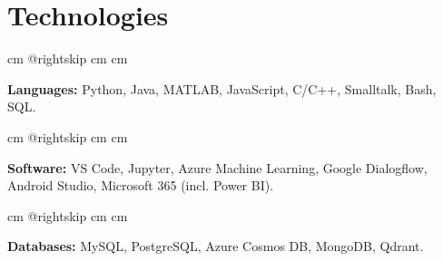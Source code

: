 \documentclass[10pt, letterpaper]{article}
\begin{document}
    
    \section{Technologies}

        \begingroup{} cm
        \advance\csname @rightskip cm
        \advance{} cm

        \textbf{Languages:} Python, Java, MATLAB, JavaScript, C/C++, Smalltalk, Bash, SQL. \par\endgroup

        \vspace{0.2 cm}
        \begingroup{} cm
        \advance\csname @rightskip cm
        \advance{} cm

        \textbf{Software:} VS Code, Jupyter, Azure Machine Learning, Google Dialogflow, Android Studio, Microsoft 365 (incl. Power BI). \par\endgroup

        \vspace{0.2 cm}
        \begingroup{} cm
        \advance\csname @rightskip cm
        \advance{} cm

        \textbf{Databases:} MySQL, PostgreSQL, Azure Cosmos DB, MongoDB, Qdrant. \par\endgroup


    
\end{document}
